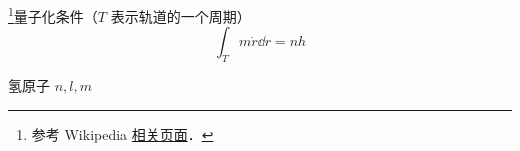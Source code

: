
\begin{issues}
\issueDraft
\end{issues}

\footnote{参考 Wikipedia \href{https://en.wikipedia.org/wiki/Bohr_model}{相关页面}．}量子化条件（$T$ 表示轨道的一个周期）
\begin{equation}
\int_T m\dot r \dd{r} = nh
\end{equation}

氢原子 $n,l,m$